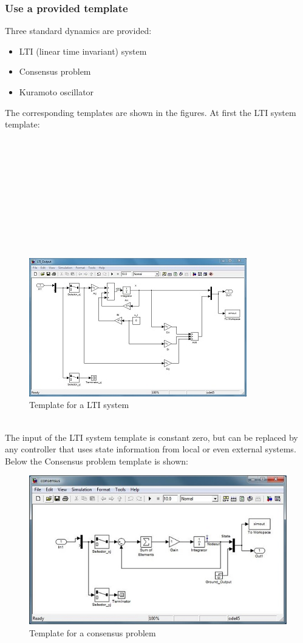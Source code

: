 \documentclass[12pt]{report}
\begin{document}
\subsubsection{Use a provided template}
Three standard dynamics are provided:
\begin{itemize}
	\item LTI (linear time invariant) system
	\item Consensus problem
	\item Kuramoto oscillator
\end{itemize}
The corresponding templates are shown in the figures. At first the LTI system template:\\
\\
\\
\\
\\
\\
\\
\\
\\
\\
\\
\begin{figure}[h]
\centering
\includegraphics[scale=.4]{templatelti}
\caption{Template for a LTI system}
\label{FIG:abb40}
\end{figure}
\\
The input of the LTI system template is constant zero, but can be replaced by any controller that uses state information from local or even external systems.
Below the Consensus problem template is shown:
\begin{figure}[h]
\centering
\includegraphics[scale=.5]{templateconsensus}
\caption{Template for a consensus problem}
\label{FIG:abb41}
\end{figure}
\end{document}

